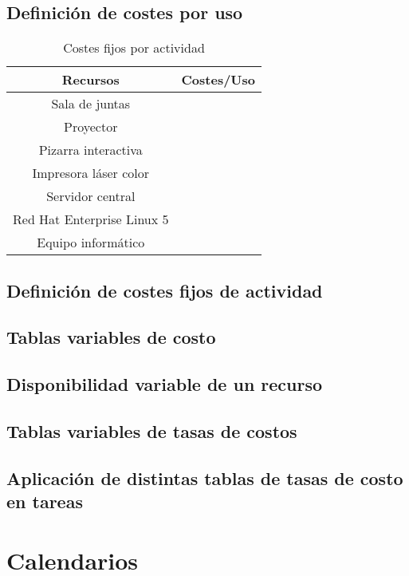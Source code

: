 \documentclass[11pt,a4paper,spanish,twoside]{report}
\begin{document}
\section{Definición de costes por uso}

\begin{table}[!h]
\centering
  \begin{tabular}{|c|c|}
    \hline
    \textbf{Recursos} & \textbf{Costes/Uso} \\
    \hline \hline
    Sala de juntas & \\
    \hline
    Proyector & \\
    \hline
    Pizarra interactiva & \\
    \hline
    Impresora láser color & \\
    \hline
    Servidor central & \\
    \hline
    Red Hat Enterprise Linux 5 & \\
    \hline
    Equipo informático & \\
    \hline

  \end{tabular}
  \caption{Costes fijos por actividad}
  \label{Tab:costefijo}
\end{table}

\section{Definición de costes fijos de actividad}

\section{Tablas variables de costo}

\section{Disponibilidad variable de un recurso}

\section{Tablas variables de tasas de costos}

\section{Aplicación de distintas tablas de tasas de costo en tareas}

\chapter{Calendarios}
\end{document}
